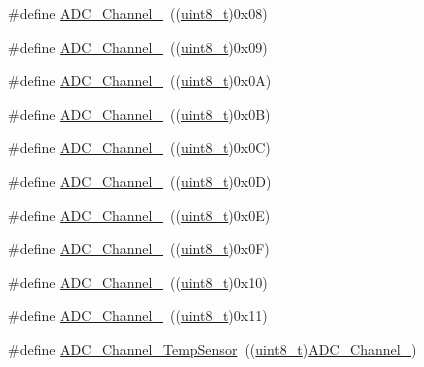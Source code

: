 \begin{DoxyCompactItemize}
\#define \hyperlink{group___a_d_c__channels_ga99b2c662d4068152e0e80a048036cc48}{A\+D\+C\+\_\+\+Channel\+\_}~((\hyperlink{_p_e___types_8h_aba7bc1797add20fe3efdf37ced1182c5}{uint8\+\_\+t})0x08)
\item 
\#define \hyperlink{group___a_d_c__channels_ga01a61c428be0cb69327e428e32a42aa1}{A\+D\+C\+\_\+\+Channel\+\_}~((\hyperlink{_p_e___types_8h_aba7bc1797add20fe3efdf37ced1182c5}{uint8\+\_\+t})0x09)
\item 
\#define \hyperlink{group___a_d_c__channels_gabfa98b580f49a82a83dcb1df32efceca}{A\+D\+C\+\_\+\+Channel\+\_}~((\hyperlink{_p_e___types_8h_aba7bc1797add20fe3efdf37ced1182c5}{uint8\+\_\+t})0x0\+A)
\item 
\#define \hyperlink{group___a_d_c__channels_ga5bfc40d938f384f22665f6e2dd945cfd}{A\+D\+C\+\_\+\+Channel\+\_}~((\hyperlink{_p_e___types_8h_aba7bc1797add20fe3efdf37ced1182c5}{uint8\+\_\+t})0x0\+B)
\item 
\#define \hyperlink{group___a_d_c__channels_gaa1e35f7870ae8f05013a681293175299}{A\+D\+C\+\_\+\+Channel\+\_}~((\hyperlink{_p_e___types_8h_aba7bc1797add20fe3efdf37ced1182c5}{uint8\+\_\+t})0x0\+C)
\item 
\#define \hyperlink{group___a_d_c__channels_ga517cda911256f722eb067d7140663230}{A\+D\+C\+\_\+\+Channel\+\_}~((\hyperlink{_p_e___types_8h_aba7bc1797add20fe3efdf37ced1182c5}{uint8\+\_\+t})0x0\+D)
\item 
\#define \hyperlink{group___a_d_c__channels_gaf1830a03fe4a3820fde4f41ba907c394}{A\+D\+C\+\_\+\+Channel\+\_}~((\hyperlink{_p_e___types_8h_aba7bc1797add20fe3efdf37ced1182c5}{uint8\+\_\+t})0x0\+E)
\item 
\#define \hyperlink{group___a_d_c__channels_ga01431a7b4e388beb241328874abdf88c}{A\+D\+C\+\_\+\+Channel\+\_}~((\hyperlink{_p_e___types_8h_aba7bc1797add20fe3efdf37ced1182c5}{uint8\+\_\+t})0x0\+F)
\item 
\#define \hyperlink{group___a_d_c__channels_ga52fb09ae9a0333a0e071da106466c659}{A\+D\+C\+\_\+\+Channel\+\_}~((\hyperlink{_p_e___types_8h_aba7bc1797add20fe3efdf37ced1182c5}{uint8\+\_\+t})0x10)
\item 
\#define \hyperlink{group___a_d_c__channels_ga58cdfe3a5625f198116d163b09698cea}{A\+D\+C\+\_\+\+Channel\+\_}~((\hyperlink{_p_e___types_8h_aba7bc1797add20fe3efdf37ced1182c5}{uint8\+\_\+t})0x11)
\item 
\#define \hyperlink{group___a_d_c__channels_ga1efc096b8d4a8d15c4a7d91f5c03c6c7}{A\+D\+C\+\_\+\+Channel\+\_\+\+Temp\+Sensor}~((\hyperlink{_p_e___types_8h_aba7bc1797add20fe3efdf37ced1182c5}{uint8\+\_\+t})\hyperlink{openmotestm_2library_2inc_2stm32f10x__adc_8h_a52fb09ae9a0333a0e071da106466c659}{A\+D\+C\+\_\+\+Channel\+\_})

\end{DoxyCompactItemize}

